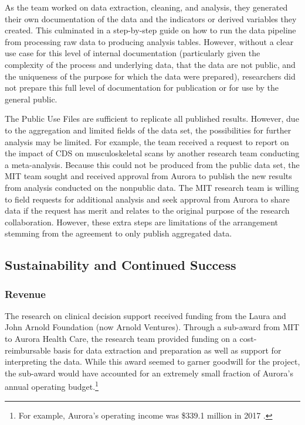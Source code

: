 \documentclass[
]{WileySix}
\begin{document}
As the team worked on data extraction, cleaning, and analysis, they generated their own documentation of the data and the indicators or derived variables they created. This culminated in a step-by-step guide on how to run the data pipeline from processing raw data to producing analysis tables. However, without a clear use case for this level of internal documentation (particularly given the complexity of the process and underlying data, that the data are not public, and the uniqueness of the purpose for which the data were prepared), researchers did not prepare this full level of documentation for publication or for use by the general public.

The Public Use Files are sufficient to replicate all published results. However, due to the aggregation and limited fields of the data set, the possibilities for further analysis may be limited. For example, the team received a request to report on the impact of CDS on musculoskeletal scans by another research team conducting a meta-analysis. Because this could not be produced from the public data set, the MIT team sought and received approval from Aurora to publish the new results from analysis conducted on the nonpublic data. The MIT research team is willing to field requests for additional analysis and seek approval from Aurora to share data if the request has merit and relates to the original purpose of the research collaboration. However, these extra steps are limitations of the arrangement stemming from the agreement to only publish aggregated data.

\hypertarget{sustainability-and-continued-success-4}{%
\subsection{Sustainability and Continued Success}\label{sustainability-and-continued-success-4}}

\hypertarget{revenue-3}{%
\subsubsection{Revenue}\label{revenue-3}}

The research on clinical decision support received funding from the Laura and John Arnold Foundation (now Arnold Ventures). Through a sub-award from MIT to Aurora Health Care, the research team provided funding on a cost-reimbursable basis for data extraction and preparation as well as support for interpreting the data. While this award seemed to garner goodwill for the project, the sub-award would have accounted for an extremely small fraction of Aurora's annual operating budget.\footnote{For example, Aurora's operating income was \$339.1 million in 2017 \citep[see][]{aurorahealthcareinc.andaffiliates2018}.}
\end{document}
